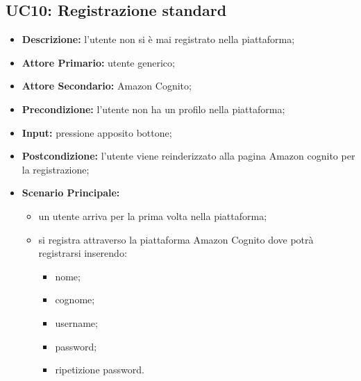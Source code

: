 \subsection{UC10: Registrazione standard}
\label{sec:UC10}
\begin{itemize}
    \item \textbf{Descrizione:} l'utente non si è mai registrato nella piattaforma;
    \item \textbf{Attore Primario:} utente generico;
    \item \textbf{Attore Secondario:} Amazon Cognito;
    \item \textbf{Precondizione:} l'utente non ha un profilo nella piattaforma;
    \item \textbf{Input:} pressione apposito bottone;
    \item \textbf{Postcondizione:} l'utente viene reinderizzato alla pagina Amazon cognito per la registrazione;
    \item \textbf{Scenario Principale:}
    \begin{itemize}
        \item un utente arriva per la prima volta nella piattaforma;
        \item si registra attraverso la piattaforma Amazon Cognito dove potrà registrarsi inserendo:
        \begin{itemize}
            \item nome;
            \item cognome;
            \item username;
            \item password;
            \item ripetizione password.
        \end{itemize}
    \end{itemize} 
\end{itemize}